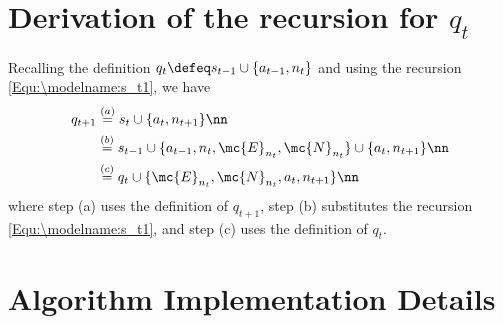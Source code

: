 \appendix

\section{Derivation of the recursion for $q_t$}
\label{Appendix:qt_derivation}

Recalling the definition $q_t \defeq s_{t-1} \cup \{a_{t-1},n_t\}$ and using the recursion \eqref{Equ:\modelname:s_t1}, we have
    \begin{align}
        q_{t+1}     &\overset{(a)}{=}  
                            s_t \cup \{a_t, n_{t+1} \}
                            \nn\\
                    &\overset{(b)}{=}
                            s_{t-1} \cup \{a_{t-1}, n_t, \mc{E}_{n_t}, \mc{N}_{n_t} \}
                            \cup \{ a_t, n_{t+1} \}
                            \nn\\
                    &\overset{(c)}{=}
                            q_t \cup \{ \mc{E}_{n_t}, \mc{N}_{n_t}, a_t, n_{t+1} \}
                            \nn
    \end{align}
where step (a) uses the definition of $q_{t+1}$, step (b) substitutes the recursion \eqref{Equ:\modelname:s_t1}, and step (c) uses the definition of $q_t$.


\section{Algorithm Implementation Details}
\label{Appendix:AlgDetails}

